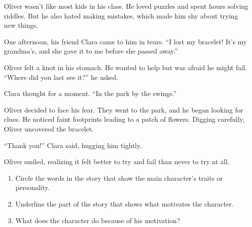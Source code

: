 \documentclass[12pt]{article}
\begin{document}
\begin{tcolorbox}[colframe=black!60, colback=white, 
coltitle=black, colbacktitle=black!15, fonttitle=\bfseries\Large, 
title=Text: Oliver and the Lost Bracelet, halign title=center, left=10pt, right=10pt, top=10pt, bottom=15pt]


Oliver wasn’t like most kids in his class. He loved puzzles and spent hours solving riddles. But he also hated making mistakes, which made him shy about trying new things.

One afternoon, his friend Clara came to him in tears. “I lost my bracelet! It’s my grandma’s, and she gave it to me before she passed away.”

Oliver felt a knot in his stomach. He wanted to help but was afraid he might fail. “Where did you last see it?” he asked.

Clara thought for a moment. “In the park by the swings.”

Oliver decided to face his fear. They went to the park, and he began looking for clues. He noticed faint footprints leading to a patch of flowers. Digging carefully, Oliver uncovered the bracelet.

“Thank you!” Clara said, hugging him tightly.

Oliver smiled, realizing it felt better to try and fail than never to try at all.

 

\end{tcolorbox}

\vspace{1em}


\begin{tcolorbox}[colframe=black!60, colback=white, 
coltitle=black, colbacktitle=black!15, fonttitle=\bfseries\Large, 
title=Guided Practice, halign title=center, left=10pt, right=10pt, top=10pt, bottom=15pt]

\begin{enumerate}[itemsep=1em]
    \item Circle the words in the story that show the main character's traits or personality.
    \item Underline the part of the story that shows what motivates the character.
    \item What does the character do because of his motivation?
    \\[0.8cm] \underline{\hspace{14cm}}  
    \\[0.8cm] \underline{\hspace{14cm}}  
    \\[0.8cm] \underline{\hspace{14cm}} 
\end{enumerate}
\end{tcolorbox}
\vspace{1em}
\end{document}
